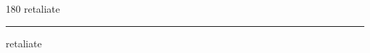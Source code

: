 
\begin{frame}
\begin{center}
\begin{turn}{180}
{\fontsize{2.5cm}{1em}\selectfont retaliate}
\end{turn}
\vspace{1em}\par  
\hrule
\vspace{1em}\par  
{\fontsize{2.5cm}{1em}\selectfont retaliate}
\end{center}
\end{frame}
